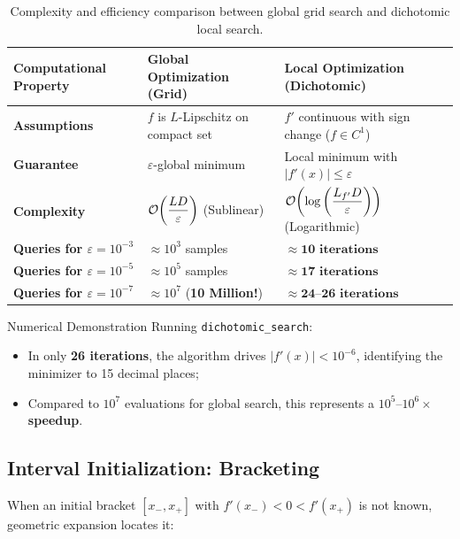 \begin{table}[H]
\centering
\small
\renewcommand{\arraystretch}{1.25}
\begin{tabularx}{\linewidth}{l Y Y}
\toprule
\textbf{Computational Property} & \textbf{Global Optimization (Grid)} & \textbf{Local Optimization (Dichotomic)} \\
\midrule
\textbf{Assumptions} & $f$ is $L$-Lipschitz on compact set & $f'$ continuous with sign change ($f \in C^1$) \\
\textbf{Guarantee} & $\varepsilon$-global minimum & Local minimum with $|f'(x)| \le \varepsilon$ \\
\textbf{Complexity} & $\mathcal{O}\!\left(\dfrac{L D}{\varepsilon}\right)$ (Sublinear) & $\mathcal{O}\!\left(\log\left(\dfrac{L_{f'} D}{\varepsilon}\right)\right)$ (Logarithmic) \\
\midrule
\textbf{Queries for $\varepsilon = 10^{-3}$} & $\approx 10^3$ samples & $\approx \mathbf{10\text{ iterations}}$ \\
\textbf{Queries for $\varepsilon = 10^{-5}$} & $\approx 10^5$ samples & $\approx \mathbf{17\text{ iterations}}$ \\
\textbf{Queries for $\varepsilon = 10^{-7}$} & $\approx 10^7$ (\textbf{10 Million!}) & $\approx \mathbf{24\text{--}26\text{ iterations}}$ \\
\bottomrule
\end{tabularx}
\caption{Complexity and efficiency comparison between global grid search and dichotomic local search.}
\label{tab:comparison-global-dichotomic-en}
\end{table}

\begin{noteblock}{Numerical Demonstration}
Running \texttt{dichotomic\_search}:
\begin{itemize}
    \item In only \textbf{26 iterations}, the algorithm drives $|f'(x)| < 10^{-6}$, identifying the minimizer to 15 decimal places;
    \item Compared to $10^7$ evaluations for global search, this represents a \textbf{$10^5\text{--}10^6\times$ speedup}.
\end{itemize}
\end{noteblock}

\subsection{Interval Initialization: Bracketing}
When an initial bracket $[x_-, x_+]$ with $f'(x_-) < 0 < f'(x_+)$ is not known, geometric expansion locates it:

